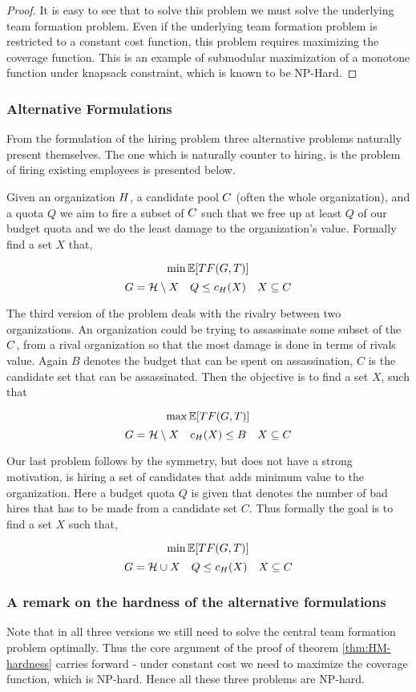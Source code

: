 \begin{proof}
It is easy to see that to solve this problem we must solve the underlying team formation problem. Even if the underlying team formation problem is restricted to a constant cost function, this problem requires maximizing the coverage function. This is an example of submodular maximization of a monotone function under knapsack constraint, which is known to be NP-Hard.  
\end{proof}

\subsubsection{Alternative Formulations}

From the formulation of the hiring problem three alternative problems naturally present themselves. The one which is naturally counter to hiring, is the problem of firing existing employees is presented below.  

Given an organization ${H}$, a candidate pool ${C}$ (often the whole organization), and a quota $Q$ we aim to fire a subset  of ${C}$ such that we free up at least $Q$ of our budget quota and we do the least damage to the organization's value. Formally find a set $X$ that, 

$$ \min \mathbb{E}[TF(G,T)] $$
$$ G = \mathcal{H} \setminus X \quad Q \le c_H(X) \quad  X \subseteq C $$

The third version of the problem deals with the rivalry between two organizations. An organization could be trying to assassinate some subset of the ${C}$, from a rival organization so that the most damage is done in terms of rivals value. Again $B$ denotes the budget that can be spent on assassination, $C$ is the candidate set that can be assassinated. Then the objective is to find a set $X$, such that

$$ \max \mathbb{E}[TF(G,T)] $$
$$ G = \mathcal{H} \setminus X \quad c_H(X) \le B \quad  X \subseteq C $$

Our last problem follows by the symmetry, but does not have a strong motivation, is hiring a set of candidates that adds minimum value to the organization. Here a budget quota $Q$ is given that denotes the number of bad hires that has to be made from a candidate set $C$. Thus formally the goal is to find a set $X$ such that,

$$ \min \mathbb{E}[TF(G,T)] $$
$$ G = \mathcal{H} \cup X \quad Q \le c_H(X) \quad  X \subseteq C $$

\subsubsection{A remark on the hardness of the alternative formulations}

Note that in all three versions we still need to solve the central team formation problem optimally. Thus the core argument of  the proof of theorem \ref{thm:HM-hardness} carries forward - under constant cost we need to maximize the coverage function, which is NP-hard. Hence all these three problems are NP-hard.